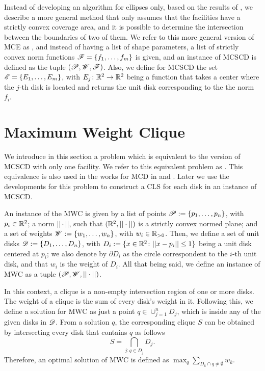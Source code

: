 Instead of developing an algorithm for ellipses only, based on the results of , we describe a more general method that only assumes that the facilities have a strictly convex coverage area, and it is possible to determine the intersection between the boundaries of two of them.
We refer to this more general version of MCE as , and instead of having a list of shape parameters, a list of strictly convex norm functions $\mathscr{F}=\{f_1, \dots, f_m\}$ is given, and an instance of MCSCD is defined as the tuple $(\mathscr{P}, \mathscr{W}, \mathscr{F})$. Also, we define for MCSCD the set $\mathscr{E}=\{E_1, \dots, E_m\}$, with $E_j\colon \mathbb{R}^2 \to \mathbb{R}^2$ being a function that takes a center where the $j$-th disk is located and returns the unit disk corresponding to the the norm $f_i$.

\section{Maximum Weight Clique}

We introduce in this section a problem which is equivalent to the version of MCSCD with only one facility. We refer to this equivalent problem as . This equivalence is also used in the works for MCD in  and . Later we use the developments for this problem to construct a CLS for each disk in an instance of MCSCD.

An instance of the MWC is given by a list of points \mbox{$\mathscr{P}:=\{p_1,\dots,p_n\}$}, with $p_i \in \mathbb{R}^2$; 
a norm $||\cdot||$, such that $(\mathbb{R}^2, ||\cdot||)$ is a strictly convex normed plane; and a set of weights \mbox{$\mathscr{W}:=\{w_1, \dots, w_n\}$}, with $w_i\in \mathbb{R}_{>0}$. 
Then, we define a set of unit disks $\mathscr{D}:=\{D_1, \dots, D_n\}$, with $D_i:=\{x \in \mathbb{R}^2 \colon ||x-p_i|| \le 1\}$ being a unit disk centered at $p_i$; we also denote by $\partial D_i$ as the circle correspondent to the $i$-th unit disk, and that $w_i$ is the weight of $D_i$.
All that being said, we define an instance of MWC as a tuple $(\mathscr{P}, \mathscr{W}, ||\cdot||)$.

In this context, a clique is a non-empty intersection region of one or more disks. The weight of a clique is the sum of every disk's weight in it.
Following this, we define a solution for MWC as just a point $q\in\cup_{j=1}^n D_j$, which is inside any of the given disks in $\mathscr{D}$.
From a solution $q$, the corresponding clique $S$ can be obtained by intersecting every disk that contains $q$ as follows
\begin{equation*}
	S = \bigcap_{j : q \in D_j} D_j.
\end{equation*}
Therefore, an optimal solution of MWC is defined as	$\max_{q} \sum_{D_k \cap q \neq \emptyset} w_k$.


